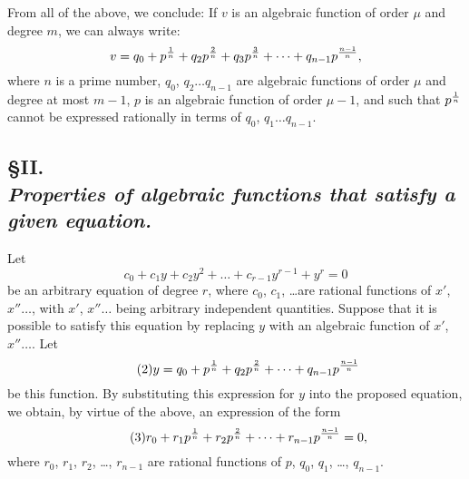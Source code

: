 \documentclass[oneside, 12 pt, leqno]{memoir}
\let\oldfrac\frac
\def\frac#1#2{\mathchoice{\text{\scalebox{.83}{${\oldfrac{#1}{#2}}$}}}{\text{\scalebox{.83}{${\displaystyle\oldfrac{#1}{#2}}$}}}{\genfrac{}{}{}{2}{#1}{#2}}{\genfrac{}{}{}{3}{#1}{#2}}}
\begin{document}
From all of the above, we conclude: If \(v\) is an algebraic function of order \(\mu\) and degree \(m\), we can always write:
\[v=q_0+p^{\frac{1}{n}}+q_2 p^{\frac{2}{n}}+q_3 p^{\frac{3}{n}}+\dots+q_{n-1} p^{\frac{n-1}{n}},\]
where \(n\) is a prime number, \(q_0\), \(q_2 \dots q_{n-1}\) are algebraic functions of order \(\mu\) and degree at most \(m-1\), \(p\) is an algebraic function of order \(\mu-1\), and such that \(p^{\frac{1}{n}}\) cannot be expressed rationally in terms of \(q_0\), \(q_1 \dots q_{n-1}\).

\subsection*{\S II.\\
{\scriptsize \textit{Properties of algebraic functions that satisfy a given equation.}}}

Let 
\[\tag{1} c_0+c_1 y+c_2 y^2+\dots+c_{r-1} y^{r-1}+y^r=0\]
be an arbitrary equation of degree \(r\), where \(c_0\), \(c_1\), \dots are rational functions of \(x'\), \(x''\dots\), with \(x'\), \(x'' \dots\) being arbitrary independent quantities. Suppose that it is possible to satisfy this equation by replacing \(y\) with an algebraic function of \(x'\), \(x''\dots\). Let 
\[\tag{2}y=q_0+p^{\frac{1}{n}}+q_2 p^{\frac{2}{n}}+\dots+q_{n-1} p^{\frac{n-1}{n}}\]
be this function. By substituting this expression for \(y\) into the proposed equation, we obtain, by virtue of the above, an expression of the form 
\[\tag{3}r_0+r_1 p^{\frac{1}{n}}+r_2 p^{\frac{2}{n}}+\dots+r_{n-1} p^{\frac{n-1}{n}}=0,\] 
where \(r_0\), \(r_1\), \(r_2\), \dots, \(r_{n-1}\) are rational functions of \(p\), \(q_0\), \(q_1\), \dots, \(q_{n-1}\).
\end{document}
